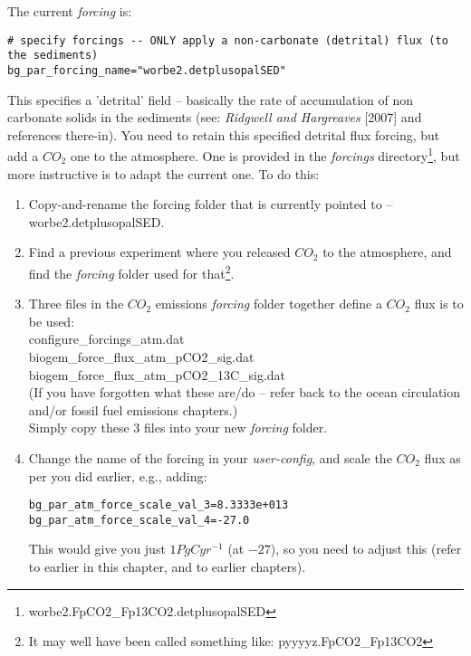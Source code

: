 The current \textit{forcing} is:
\vspace{-1mm}\small\begin{verbatim}
# specify forcings -- ONLY apply a non-carbonate (detrital) flux (to the sediments)
bg_par_forcing_name="worbe2.detplusopalSED"
\end{verbatim}\normalsize\vspace{-1mm}
This specifies a 'detrital' field -- basically the rate of accumulation of non carbonate solids in the sediments (see: \textit{Ridgwell and Hargreaves} [2007] and references there-in). You need to retain this specified detrital flux forcing, but add a \(CO_{2}\) one to the atmosphere. One is provided in the \textit{forcings} directory\footnote{\textsf{\footnotesize worbe2.FpCO2\_Fp13CO2.detplusopalSED}}, but more instructive is to adapt the current one. To do this:
\begin{enumerate}[noitemsep]
\vspace{1mm}
\item Copy-and-rename the forcing folder that is currently pointed to -- \textsf{\footnotesize worbe2.detplusopalSED}.
\vspace{1mm}
\item Find a previous experiment where you released \(CO_{2}\) to the atmosphere, and find the \textit{forcing} folder used for that\footnote{It may well have been called something like: \textsf{\footnotesize pyyyyz.FpCO2\_Fp13CO2}}.
\vspace{1mm}
\item Three files in the \(CO_{2}\) emissions \textit{forcing} folder together define a \(CO_{2}\) flux is to be used:
\\\textsf{\footnotesize configure\_forcings\_atm.dat}
\\\textsf{\footnotesize biogem\_force\_flux\_atm\_pCO2\_sig.dat}
\\\textsf{\footnotesize biogem\_force\_flux\_atm\_pCO2\_13C\_sig.dat}
\\(If you have forgotten what these are/do -- refer back to the ocean circulation and/or fossil fuel emissions chapters.)
\\Simply copy these 3 files into your new \textit{forcing} folder.
\vspace{1mm}
\item Change the name of the forcing in your \textit{user-config}, and scale the \(CO_{2}\) flux as per you did earlier, e.g., adding:
\vspace{-1mm}\small\begin{verbatim}
bg_par_atm_force_scale_val_3=8.3333e+013
bg_par_atm_force_scale_val_4=-27.0
\end{verbatim}\normalsize\vspace{-1mm}
This would give you just \(1 PgC yr^{-1}\) (at \(-27\)\permille), so you need to adjust this (refer to earlier in this chapter, and to earlier chapters).
\end{enumerate}

